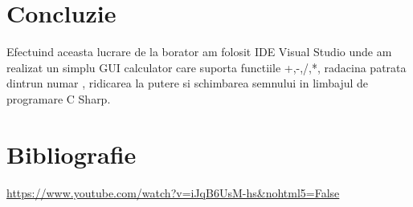 \documentclass[11pt]{article}
\begin{document}
\section{Concluzie}
Efectuind aceasta lucrare de la borator am folosit IDE Visual Studio unde am realizat un simplu GUI  calculator  care suporta functiile +,-,/,*, radacina patrata dintrun numar , ridicarea la putere si schimbarea semnului in limbajul de programare C Sharp.

\section{Bibliografie}
\url{https://www.youtube.com/watch?v=iJqB6UsM-hs&nohtml5=False}
\end{document}
